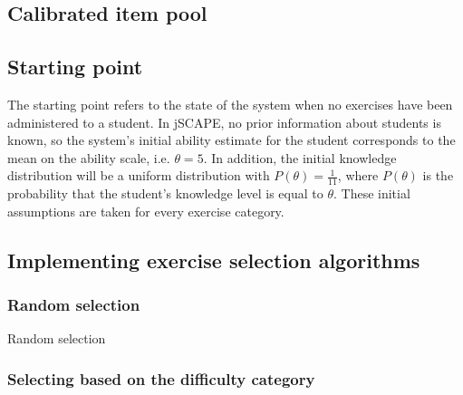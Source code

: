 \subsection{Calibrated item pool}

\subsection{Starting point}
The starting point refers to the state of the system when no exercises have been administered to a student. In jSCAPE, no prior information about students is known, so the system's initial ability estimate for the student corresponds to the mean on the ability scale, i.e. $\theta = 5$. In addition, the initial knowledge distribution will be a uniform distribution with $P(\theta)=\frac{1}{11}$, where $P(\theta)$ is the probability that the student's knowledge level is equal to $\theta$. These initial assumptions are taken for every exercise category.

\subsection{Implementing exercise selection algorithms}

\subsubsection{Random selection}
Random selection

\subsubsection{Selecting based on the difficulty category}


